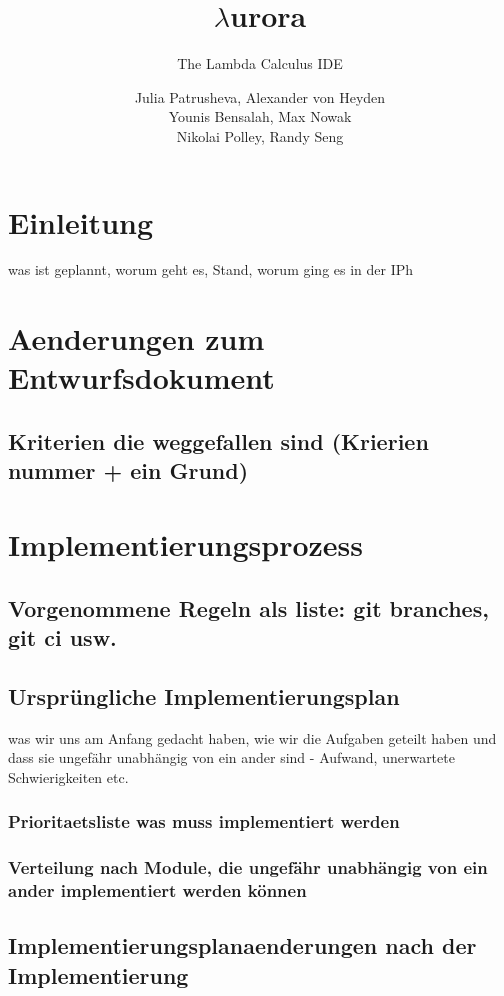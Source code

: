 \documentclass[parskip=full,11pt,twoside]{scrartcl}
\title{$\lambda$urora}
\subtitle{The Lambda Calculus IDE}
\author{Julia Patrusheva, Alexander von Heyden\\
Younis Bensalah, Max Nowak\\
Nikolai Polley, Randy Seng}
\begin{document}
\maketitle
\tableofcontents
\section{Einleitung}
was ist geplannt, worum geht es, Stand, worum ging es in der IPh
\pagebreak

\section{Aenderungen zum Entwurfsdokument}
\subsection{Kriterien die weggefallen sind (Krierien nummer + ein Grund)}
\pagebreak

\section{Implementierungsprozess}
\subsection{Vorgenommene Regeln als liste: git branches, git ci usw.}
\subsection{Ursprüngliche Implementierungsplan}
was wir uns am Anfang gedacht haben, wie wir die Aufgaben geteilt haben und dass sie ungefähr unabhängig von ein ander sind - Aufwand, unerwartete Schwierigkeiten etc.
\subsubsection{Prioritaetsliste was muss implementiert werden}
\subsubsection{Verteilung nach Module, die ungefähr unabhängig von ein ander implementiert werden können}
\subsection{Implementierungsplanaenderungen nach der Implementierung}
\end{document}
